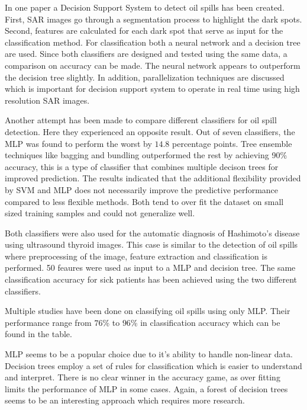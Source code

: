 In one paper a Decision Support System to detect oil spills has been created. First, SAR images go through a segmentation process to highlight the dark spots. Second, features are calculated for each dark spot that serve as input for the classification method.  For classification both a neural network and a decision tree are used. Since both classifiers are designed and tested using the same data, a comparison on accuracy can be made. The neural network appears to outperform the decision tree slightly. In addition, parallelization techniques are discussed which is important for decision support system to operate in real time using high resolution SAR images.\cite{Mera201472}
	
Another attempt has been made to compare different classifiers for oil spill detection.\cite{Xu201414} Here they experienced an opposite result. Out of seven classifiers, the MLP was found to perform the worst by $14.8$ percentage points. Tree ensemble techniques like bagging and bundling outperformed the rest by achieving 90\% accuracy, this is a type of classifier that combines multiple decison trees for improved prediction. The results indicated that the additional flexibility provided by SVM and MLP does not necessarily improve the predictive performance compared to less flexible methods. Both tend to over fit the dataset on small sized training samples and could not generalize well. 
	
Both classifiers were also used for the automatic diagnosis of Hashimoto's disease using ultrasound thyroid images\cite{Omiotek201340}. This case is similar to the detection of oil spills where preprocessing of the image, feature extraction and classification is performed. 50 feaures were used as input to a MLP and decision tree. The same classification accuracy for sick patients has been achieved using the two different classifiers.

Multiple studies\cite{Topouzelis200762}\cite{Delfrate200038}\cite{Topouzelis200930}\cite{Topouzelis200924}\cite{Delfrate2004} have been done on classifying oil spills using only MLP. Their performance range from $76$\% to $96$\% in classification accuracy which can be found in the table. 

MLP seems to be a popular choice due to it's ability to handle non-linear data. Decision trees employ a set of rules for classification which is easier to understand and interpret. There is no clear winner in the accuracy game, as over fitting limits the performance of MLP in some cases. Again, a forest of decision trees seems to be an interesting approach which requires more research.






	